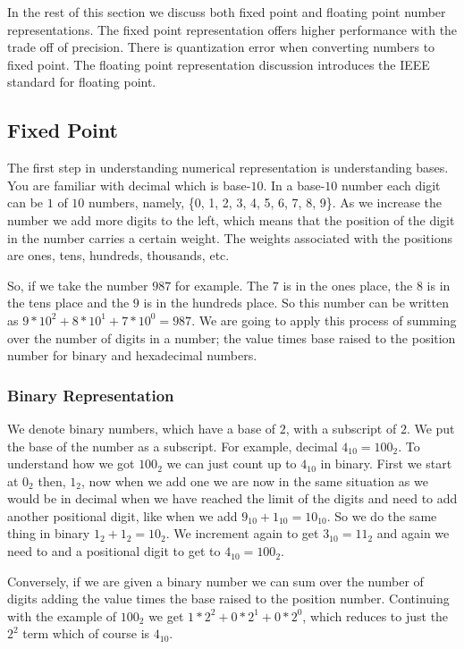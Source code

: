 In the rest of this section we discuss both fixed point and floating point number representations. The fixed point representation offers higher performance with the trade off of precision. There is quantization error when converting numbers to fixed point. The floating point representation discussion introduces the \ac{IEEE} standard for floating point.
	
\subsection{Fixed Point}

The first step in understanding numerical representation is understanding bases. You are familiar with decimal which is base-$10$. In a base-$10$ number each digit can be $1$ of $10$ numbers, namely, \{0, 1, 2, 3, 4, 5, 6, 7, 8, 9\}. As we increase the number we add more digits to the left, which means that the position of the digit in the number carries a certain weight. The weights associated with the positions are ones, tens, hundreds, thousands, etc.

So, if we take the number $987$ for example. The $7$ is in the ones place, the $8$ is in the tens place and the $9$ is in the hundreds place. So this number can be written as $9*10^2 + 8*10^1 + 7*10^0 = 987$. We are going to apply this process of summing over the number of digits in a number; the value times base raised to the position number for binary and hexadecimal numbers. 

\subsubsection{Binary Representation}
	
We denote binary numbers, which have a base of $2$, with a subscript of $2$. We put the base of the number as a subscript. For example, decimal $4_{10} = {100}_2$. To understand how we got ${100}_2$ we can just count up to $4_{10}$ in binary. First we start at $0_{2}$ then, $1_2$, now when we add one we are now in the same situation as we would be in decimal when we have reached the limit of the digits and need to add another positional digit, like when we add $9_{10} + 1_{10} = 10_{10}$. So we do the same thing in binary $1_2 + 1_2 = 10_2$. We increment again to get $3_{10} = 11_2$ and again we need to and a positional digit to get to $4_{10} = 100_2$.

Conversely, if we are given a binary number we can sum over the number of digits adding the value times the base raised to the position number. Continuing with the example of $100_2$ we get $1*2^2 + 0*2^1 + 0*2^0$, which reduces to just the $2^2$ term which of course is $4_{10}$.
	
